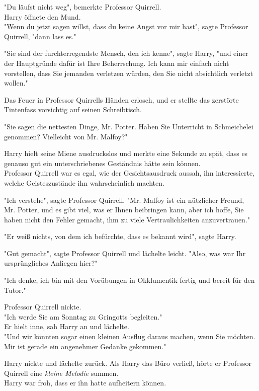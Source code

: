 {"Du läufst nicht weg", bemerkte Professor Quirrell.\\ Harry öffnete den Mund.\\ "Wenn du jetzt sagen willst, dass du keine Angst vor mir hast", sagte Professor Quirrell, "dann lass es."

"Sie sind der furchterregendste Mensch, den ich kenne", sagte Harry, "und einer der Hauptgründe dafür ist Ihre Beherrschung. Ich kann mir einfach nicht vorstellen, dass Sie jemanden verletzen würden, den Sie nicht absichtlich verletzt wollen."

Das Feuer in Professor Quirrells Händen erlosch, und er stellte das zerstörte Tintenfass vorsichtig auf seinen Schreibtisch.

"Sie sagen die nettesten Dinge, Mr. Potter. Haben Sie Unterricht in Schmeichelei genommen? Vielleicht von Mr. Malfoy?"

Harry hielt seine Miene ausdruckslos und merkte eine Sekunde zu spät, dass es genauso gut ein unterschriebenes Geständnis hätte sein können.\\ Professor Quirrell war es egal, wie der Gesichtsausdruck aussah, ihn interessierte, welche Geisteszustände ihn wahrscheinlich machten.

"Ich verstehe", sagte Professor Quirrell. "Mr. Malfoy ist ein nützlicher Freund, Mr. Potter, und es gibt viel, was er Ihnen beibringen kann, aber ich hoffe, Sie haben nicht den Fehler gemacht, ihm zu viele Vertraulichkeiten anzuvertrauen."

"Er weiß nichts, von dem ich befürchte, dass es bekannt wird", sagte Harry.

"Gut gemacht", sagte Professor Quirrell und lächelte leicht. "Also, was war Ihr ursprüngliches Anliegen hier?"

"Ich denke, ich bin mit den Vorübungen in Okklumentik fertig und bereit für den Tutor."

Professor Quirrell nickte.\\ "Ich werde Sie am Sonntag zu Gringotts begleiten."\\ Er hielt inne, sah Harry an und lächelte.\\ "Und wir könnten sogar einen kleinen Ausflug daraus machen, wenn Sie möchten. Mir ist gerade ein angenehmer Gedanke gekommen."

Harry nickte und lächelte zurück. Als Harry das Büro verließ, hörte er Professor Quirrell eine \emph{kleine Melodie} summen.\\ Harry war froh, dass er ihn hatte aufheitern können.

}
